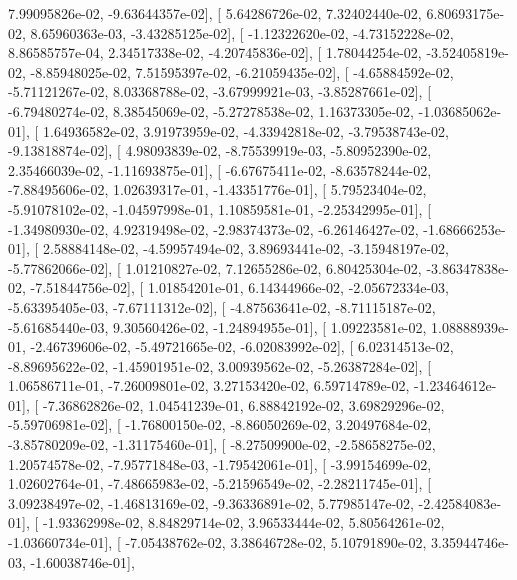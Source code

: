 \documentclass{article}
\begin{document}
          7.99095826e-02,  -9.63644357e-02],
       [  5.64286726e-02,   7.32402440e-02,   6.80693175e-02,
          8.65960363e-03,  -3.43285125e-02],
       [ -1.12322620e-02,  -4.73152228e-02,   8.86585757e-04,
          2.34517338e-02,  -4.20745836e-02],
       [  1.78044254e-02,  -3.52405819e-02,  -8.85948025e-02,
          7.51595397e-02,  -6.21059435e-02],
       [ -4.65884592e-02,  -5.71121267e-02,   8.03368788e-02,
         -3.67999921e-03,  -3.85287661e-02],
       [ -6.79480274e-02,   8.38545069e-02,  -5.27278538e-02,
          1.16373305e-02,  -1.03685062e-01],
       [  1.64936582e-02,   3.91973959e-02,  -4.33942818e-02,
         -3.79538743e-02,  -9.13818874e-02],
       [  4.98093839e-02,  -8.75539919e-03,  -5.80952390e-02,
          2.35466039e-02,  -1.11693875e-01],
       [ -6.67675411e-02,  -8.63578244e-02,  -7.88495606e-02,
          1.02639317e-01,  -1.43351776e-01],
       [  5.79523404e-02,  -5.91078102e-02,  -1.04597998e-01,
          1.10859581e-01,  -2.25342995e-01],
       [ -1.34980930e-02,   4.92319498e-02,  -2.98374373e-02,
         -6.26146427e-02,  -1.68666253e-01],
       [  2.58884148e-02,  -4.59957494e-02,   3.89693441e-02,
         -3.15948197e-02,  -5.77862066e-02],
       [  1.01210827e-02,   7.12655286e-02,   6.80425304e-02,
         -3.86347838e-02,  -7.51844756e-02],
       [  1.01854201e-01,   6.14344966e-02,  -2.05672334e-03,
         -5.63395405e-03,  -7.67111312e-02],
       [ -4.87563641e-02,  -8.71115187e-02,  -5.61685440e-03,
          9.30560426e-02,  -1.24894955e-01],
       [  1.09223581e-02,   1.08888939e-01,  -2.46739606e-02,
         -5.49721665e-02,  -6.02083992e-02],
       [  6.02314513e-02,  -8.89695622e-02,  -1.45901951e-02,
          3.00939562e-02,  -5.26387284e-02],
       [  1.06586711e-01,  -7.26009801e-02,   3.27153420e-02,
          6.59714789e-02,  -1.23464612e-01],
       [ -7.36862826e-02,   1.04541239e-01,   6.88842192e-02,
          3.69829296e-02,  -5.59706981e-02],
       [ -1.76800150e-02,  -8.86050269e-02,   3.20497684e-02,
         -3.85780209e-02,  -1.31175460e-01],
       [ -8.27509900e-02,  -2.58658275e-02,   1.20574578e-02,
         -7.95771848e-03,  -1.79542061e-01],
       [ -3.99154699e-02,   1.02602764e-01,  -7.48665983e-02,
         -5.21596549e-02,  -2.28211745e-01],
       [  3.09238497e-02,  -1.46813169e-02,  -9.36336891e-02,
          5.77985147e-02,  -2.42584083e-01],
       [ -1.93362998e-02,   8.84829714e-02,   3.96533444e-02,
          5.80564261e-02,  -1.03660734e-01],
       [ -7.05438762e-02,   3.38646728e-02,   5.10791890e-02,
          3.35944746e-03,  -1.60038746e-01],
\end{document}
